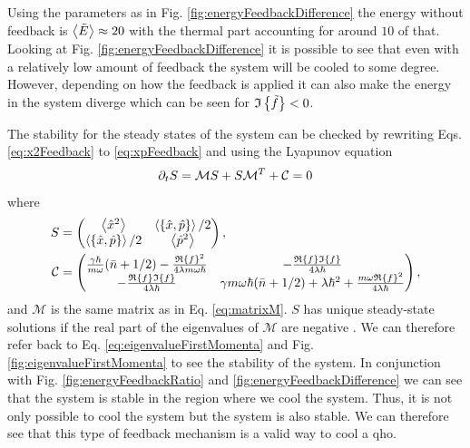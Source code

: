 Using the parameters as in Fig. \ref{fig:energyFeedbackDifference} the energy without feedback is $\expval{\tilde{E}} \approx 20$ with the thermal part accounting for around $10$ of that. Looking at Fig. \ref{fig:energyFeedbackDifference} it is possible to see that even with a relatively low amount of feedback the system will be cooled to some degree. However, depending on how the feedback is applied it can also make the energy in the system diverge which can be seen for $\mathfrak{I}\left\{\tilde{f}\right\} < 0$.

The stability for the steady states of the system can be checked by rewriting Eqs. \eqref{eq:x2Feedback} to \eqref{eq:xpFeedback} and using the Lyapunov equation
\begin{equation}
    \partial_t S = \mathcal{M} S + S \mathcal{M}^T  + \mathcal{C} = 0
\end{equation}
where 
\begin{align}
    S &= 
    \begin{pmatrix}
    \expval{\xop^2} & \expval{\acomm{\xop}{\pop}}/2\\
    \expval{\acomm{\xop}{\pop}}/2 & \expval{\pop^2}    
    \end{pmatrix},
    \\
    \mathcal{C} &=
    \begin{pmatrix}
        \frac{\gamma \hbar}{m \omega} (\nbar + 1/2) - \frac{\re{f}^2}{4\lambda m \omega \hbar} & -\frac{\re{f} \im{f}}{4 \lambda \hbar}\\
        -\frac{\re{f} \im{f}}{4 \lambda \hbar} & \gamma m \omega \hbar (\nbar + 1/2) + \lambda \hbar^2 +\frac{m \omega \re{f}^2}{4 \lambda \hbar}
    \end{pmatrix},
\end{align}
and $\mathcal{M}$ is the same matrix as in Eq. \eqref{eq:matrixM}. $S$ has unique steady-state solutions if the real part of the eigenvalues of $\mathcal{M}$ are negative \cite{Purkayastha:2022}. We can therefore refer back to Eq. \eqref{eq:eigenvalueFirstMomenta} and Fig. \ref{fig:eigenvalueFirstMomenta} to see the stability of the system. In conjunction with Fig. \ref{fig:energyFeedbackRatio} and \ref{fig:energyFeedbackDifference} we can see that the system is stable in the region where we cool the system. Thus, it is not only possible to cool the system but the system is also stable. We can therefore see that this type of feedback mechanism is a valid way to cool a \gls{qho}.